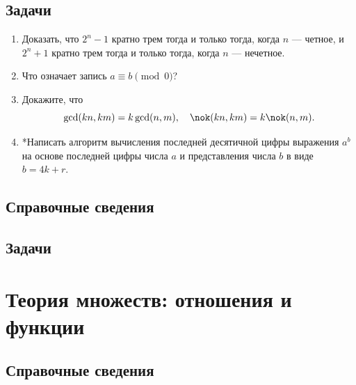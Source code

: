 \subsection*{Задачи}

\begin{enumerate}
\item Доказать, что $2^n-1$ кратно трем тогда и только тогда, когда $n$ --- четное, и $2^n+1$ кратно трем тогда и только тогда, когда $n$ --- нечетное.
\item Что означает запись $a\equiv b\pmod 0$?
\item Докажите, что
$$
\gcd(kn,km)=k\gcd(n,m),\quad \nok(kn,km)=k\nok(n,m).
$$
\item *Написать алгоритм вычисления последней десятичной цифры выражения $a^b$ на основе последней цифры числа $a$ и представления числа $b$ в виде $b=4k+r$.
\end{enumerate}

\subsection*{Справочные сведения}

\subsection*{Задачи}

\label{Permutations}


\section{Теория множеств: отношения и функции}\label{functions}\label{Rels}

\subsection*{Справочные сведения}

